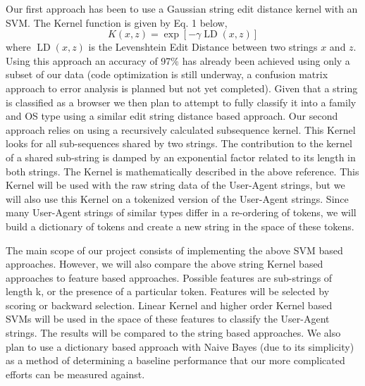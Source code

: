 \documentclass[10pt]{article}
\begin{document}
Our first approach has been to use a Gaussian string edit distance kernel with an SVM.   The Kernel function is given by Eq. 1 below,
\begin{equation}
K(x,z) = \exp \left[ - \gamma \operatorname{LD} (x,z) \right]
\end{equation}
where $\operatorname{LD}(x,z)$ is the Levenshtein Edit Distance between two strings $x$ and $z$.  Using this approach an accuracy of 97\% has already been achieved using only a subset of our data (code optimization is still underway, a confusion matrix approach to error analysis is planned but not yet completed).   Given that a string is classified as a browser we then plan to attempt to fully classify it into a family and OS type using a similar edit string distance based approach.
Our second approach relies on using a recursively calculated subsequence kernel.\cite{subseqkernel}  This Kernel looks for all sub-sequences shared by two strings.  The contribution to the kernel of a shared sub-string is damped by an exponential factor related to its length in both strings.  The Kernel is mathematically described  in the above reference.  This Kernel will be used with the raw string data of the User-Agent strings, but we will also use this Kernel on a tokenized version of the User-Agent strings.  Since many User-Agent strings of similar types differ in a re-ordering of tokens, we will build a dictionary of tokens and create a new string in the space of these tokens.  




The main scope of our project consists of implementing the above SVM based approaches.  However, we will also compare the above string Kernel based approaches to feature based approaches.  Possible features are sub-strings of length k, or the presence of a particular token.  Features will be selected by scoring or backward selection.  Linear Kernel and higher order Kernel based SVMs will be used in the space of these features to classify the User-Agent strings.  The results will be compared to the string based approaches.  We also plan to use a dictionary based approach with Naive Bayes (due to its simplicity) as a method of determining a baseline performance that our more complicated efforts can be measured against.  





\end{document}
